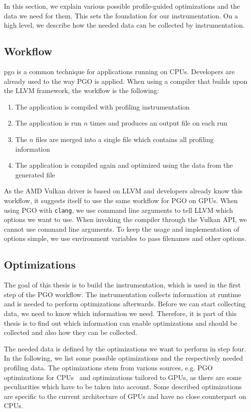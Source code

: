 \clearpage
{}
In this section, we explain various possible profile-guided optimizations and the data we need for them.
This sets the foundation for our instrumentation. On a high level, we describe how the needed data can be collected by instrumentation.

\subsection{Workflow}
\label{sub:workflow}
\Gls{pgo} is a common technique for applications running on CPUs.
Developers are already used to the way PGO is applied.
When using a compiler that builds upon the LLVM framework, the workflow is the following:
\begin{enumerate}
	\item The application is compiled with profiling instrumentation
	\item The application is run $n$ times and produces an output file on each run
	\item The $n$ files are merged into a single file which contains all profiling information
	\item The application is compiled again and optimized using the data from the generated file
\end{enumerate}
As the AMD Vulkan driver is based on LLVM and developers already know this workflow, it suggests itself to use the same workflow for PGO on GPUs.
When using PGO with \texttt{clang}, we use command line arguments to tell LLVM which options we want to use. When invoking the compiler through the Vulkan API, we cannot use command line arguments.
To keep the usage and implementation of options simple, we use environment variables to pass filenames and other options.

\subsection{Optimizations}
The goal of this thesis is to build the instrumentation, which is used in the first step of the PGO workflow. The instrumentation collects information at runtime and is needed to perform optimizations afterwards. Before we can start collecting data, we need to know which information we need. Therefore, it is part of this thesis is to find out which information can enable optimizations and should be collected and also how they can be collected.

The needed data is defined by the optimizations we want to perform in step four. In the following, we list some possible optimizations and the respectively needed profiling data.
The optimizations stem from various sources, e.g. PGO optimizations for CPUs~\cite{MicrosoftPgo} and optimizations tailored to GPUs, as there are some peculiarities which have to be taken into account.
Some described optimizations are specific to the current architecture of GPUs and have no close counterpart on CPUs.


